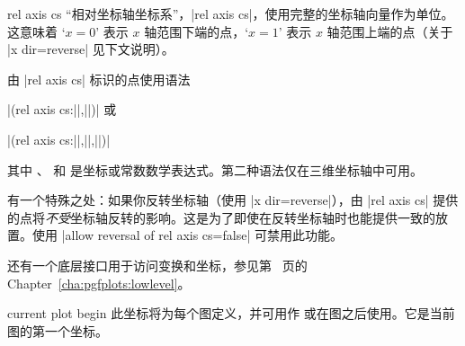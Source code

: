 \begin{coordinatesystem}{rel axis cs}
    “相对坐标轴坐标系”，|rel axis cs|，使用完整的坐标轴向量作为单位。这意味着 `$x=0$' 表示 $x$ 轴范围下端的点，`$x=1$' 表示 $x$ 轴范围上端的点（关于 |x dir=reverse| 见下文说明）。
\pgfplotsexpensiveexample
\begin{codeexample}[]
\end{codeexample}

\pgfplotsexpensiveexample
\begin{codeexample}[]
\end{codeexample}

    由 |rel axis cs| 标识的点使用语法

        |(rel axis cs:||,||)| 或

        |(rel axis cs:||,||,||)|

    \noindent 其中 、 和  是坐标或常数数学表达式。第二种语法仅在三维坐标轴中可用。

    有一个特殊之处：如果你反转坐标轴（使用 |x dir=reverse|），由 |rel axis cs| 提供的点将\emph{不受}坐标轴反转的影响。这是为了即使在反转坐标轴时也能提供一致的放置。使用 |allow reversal of rel axis cs=false| 可禁用此功能。

    还有一个底层接口用于访问变换和坐标，参见第~\pageref{cha:pgfplots:lowlevel} 页的 Chapter~\ref{cha:pgfplots:lowlevel}。
\end{coordinatesystem}

\begin{predefinednode}{current plot begin}
    此坐标将为每个图定义，并可用作  或在图之后使用。它是当前图的第一个坐标。
\end{predefinednode}


